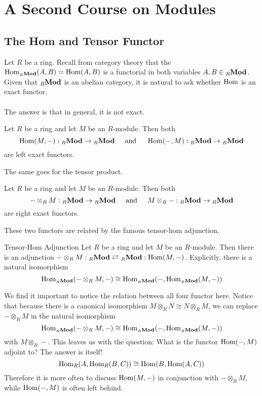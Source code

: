 \documentclass[a4paper]{article}
\begin{document}
\pagebreak
\section{A Second Course on Modules}
\subsection{The Hom and Tensor Functor}
Let $R$ be a ring. Recall from category theory that the $\operatorname{Hom}_{_R\bold{Mod}}(A,B)=\operatorname{Hom}(A,B)$ is a functorial in both variables $A,B\in{_R\bold{Mod}}$. Given that ${_R}\bold{Mod}$ is an abelian category, it is natural to ask whether $\operatorname{Hom}$ is an exact functor. \\~\\

The answer is that in general, it is not exact. 

\begin{thm}{}{} Let $R$ be a ring and let $M$ be an $R$-module. Then both $$\operatorname{Hom}(M,-):{_R\bold{Mod}}\to{_R\bold{Mod}}\;\;\;\;\text{ and }\;\;\;\;\operatorname{Hom}(-,M):{_R\bold{Mod}}\to{_R\bold{Mod}}$$ are left exact functors. 
\end{thm}

The same goes for the tensor product. 

\begin{thm} Let $R$ be a ring and let $M$ be an $R$-module. Then both $$-\otimes_R M:{_R\bold{Mod}}\to{_R\bold{Mod}}\;\;\;\;\text{ and }\;\;\;\;M\otimes_R-:{_R\bold{Mod}}\to{_R\bold{Mod}}$$ are right exact functors. 
\end{thm}

These two functors are related by the famous tensor-hom adjunction. 

\begin{thm}{Tensor-Hom Adjunction}{} Let $R$ be a ring and let $M$ be an $R$-module. Then there is an adjunction $-\otimes_RM:{_R\bold{Mod}}\rightleftarrows{_R\bold{Mod}}:\operatorname{Hom}(M,-)$. Explicitly, there is a natural isomorphism $$\operatorname{Hom}_{_R\bold{Mod}}(-\otimes_RM,-)\cong\operatorname{Hom}_{_R\bold{Mod}}(-,\operatorname{Hom}_{_R\bold{Mod}}(M,-))$$ 
\end{thm}

We find it important to notice the relation between all four functor here. Notice that because there is a canonical isomorphism $M\otimes_RN\cong N\otimes_RM$, we can replace $-\otimes_RM$ in the natural isomorphism $$\operatorname{Hom}_{_R\bold{Mod}}(-\otimes_RM,-)\cong\operatorname{Hom}_{_R\bold{Mod}}(-,\operatorname{Hom}_{_R\bold{Mod}}(M,-))$$ with $M\otimes_R-$. This leaves us with the question: What is the functor $\operatorname{Hom}(-,M)$ adjoint to? The answer is itself! $$\operatorname{Hom}_R(A,\operatorname{Hom}_R(B,C))\cong\operatorname{Hom}(B,\operatorname{Hom}(A,C))$$ Therefore it is more often to discuss $\operatorname{Hom}(M,-)$ in conjunction with $-\otimes_RM$, while $\operatorname{Hom}(-,M)$ is often left behind. \\~\\
\end{document}
